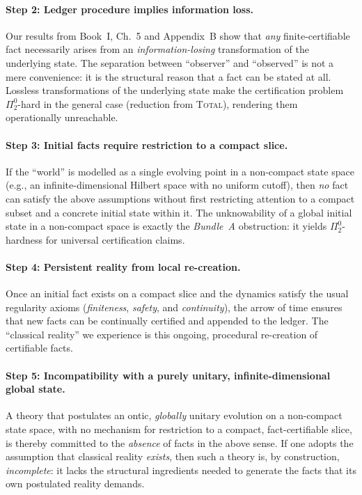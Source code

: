 \documentclass[12pt]{article}
\theoremstyle{definition}
\theoremstyle{plain}
\begin{document}
\paragraph{Step 2: Ledger procedure implies information loss.}
Our results from Book~I, Ch.~5 and Appendix~B show that
\emph{any} finite-certifiable fact necessarily arises from an
\emph{information-losing} transformation of the underlying state.
The separation between ``observer'' and ``observed''
is not a mere convenience: it is the structural reason that
a fact can be stated at all.
Lossless transformations of the underlying state
make the certification problem $\Pi^0_2$-hard in the general case
(reduction from \textsc{Total}), rendering them operationally unreachable.

\paragraph{Step 3: Initial facts require restriction to a compact slice.}
If the ``world'' is modelled as a single evolving point in a
non-compact state space (e.g., an infinite-dimensional Hilbert space
with no uniform cutoff), then \emph{no} fact can satisfy the above
assumptions without first restricting attention to a compact subset
and a concrete initial state within it.
The unknowability of a global initial state in a non-compact space
is exactly the \emph{Bundle~A} obstruction: it yields
$\Pi^0_2$-hardness for universal certification claims.

\paragraph{Step 4: Persistent reality from local re-creation.}
Once an initial fact exists on a compact slice
and the dynamics satisfy the usual regularity axioms
(\emph{finiteness}, \emph{safety}, and \emph{continuity}),
the arrow of time ensures that new facts can be continually
certified and appended to the ledger.
The ``classical reality'' we experience is this ongoing, procedural
re-creation of certifiable facts.

\paragraph{Step 5: Incompatibility with a purely unitary,
infinite-dimensional global state.}
A theory that postulates an ontic, \emph{globally} unitary evolution
on a non-compact state space, with no mechanism for restriction to
a compact, fact-certifiable slice, is thereby committed to the
\emph{absence} of facts in the above sense.
If one adopts the assumption that classical reality \emph{exists},
then such a theory is, by construction, \emph{incomplete}:
it lacks the structural ingredients needed to generate the facts that
its own postulated reality demands.
\end{document}
